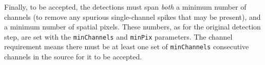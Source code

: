 Finally, to be accepted, the detections must span \emph{both} a
minimum number of channels (to remove any spurious single-channel
spikes that may be present), and a minimum number of spatial
pixels. These numbers, as for the original detection step, are set
with the \texttt{minChannels} and \texttt{minPix} parameters. The
channel requirement means there must be at least one set of
\texttt{minChannels} consecutive channels in the source for it to be
accepted.
